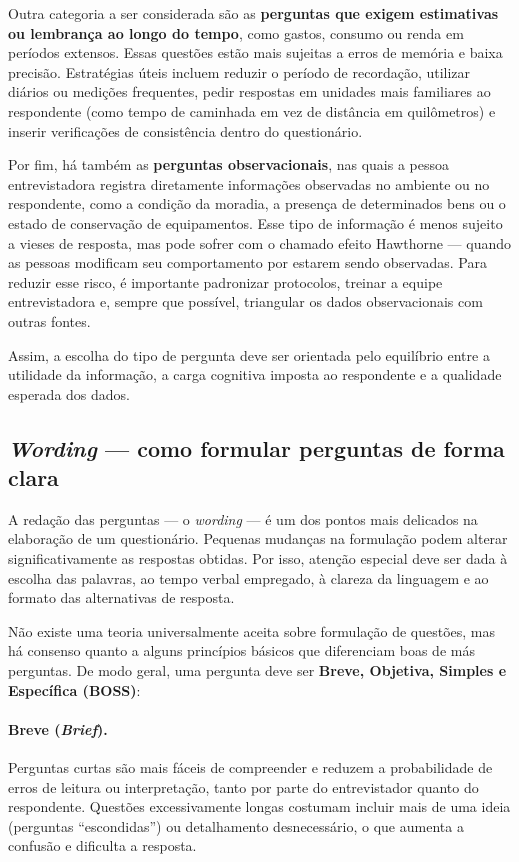 \documentclass[12pt, a4paper, openany]{book}
\begin{document}
Outra categoria a ser considerada s\~ao as \textbf{perguntas que exigem estimativas ou lembran\c{c}a ao longo do tempo}, como gastos, consumo ou renda em per\'iodos extensos. Essas quest\~oes est\~ao mais sujeitas a erros de mem\'oria e baixa precis\~ao. Estrat\'egias \'uteis incluem reduzir o per\'iodo de recorda\c{c}\~ao, utilizar di\'arios ou medi\c{c}\~oes frequentes, pedir respostas em unidades mais familiares ao respondente (como tempo de caminhada em vez de dist\^ancia em quil\^ometros) e inserir verifica\c{c}\~oes de consist\^encia dentro do question\'ario.

Por fim, h\'a tamb\'em as \textbf{perguntas observacionais}, nas quais a pessoa entrevistadora registra diretamente informa\c{c}\~oes observadas no ambiente ou no respondente, como a condi\c{c}\~ao da moradia, a presen\c{c}a de determinados bens ou o estado de conserva\c{c}\~ao de equipamentos. Esse tipo de informa\c{c}\~ao \'e menos sujeito a vieses de resposta, mas pode sofrer com o chamado efeito Hawthorne --- quando as pessoas modificam seu comportamento por estarem sendo observadas. Para reduzir esse risco, \'e importante padronizar protocolos, treinar a equipe entrevistadora e, sempre que poss\'ivel, triangular os dados observacionais com outras fontes.

Assim, a escolha do tipo de pergunta deve ser orientada pelo equil\'ibrio entre a utilidade da informa\c{c}\~ao, a carga cognitiva imposta ao respondente e a qualidade esperada dos dados.

\subsection{\textit{Wording} --- como formular perguntas de forma clara}

A reda\c{c}\~ao das perguntas --- o \textit{wording} --- \'e um dos pontos mais delicados na elabora\c{c}\~ao de um question\'ario. Pequenas mudan\c{c}as na formula\c{c}\~ao podem alterar significativamente as respostas obtidas. Por isso, aten\c{c}\~ao especial deve ser dada \`a escolha das palavras, ao tempo verbal empregado, \`a clareza da linguagem e ao formato das alternativas de resposta.

N\~ao existe uma teoria universalmente aceita sobre formula\c{c}\~ao de quest\~oes, mas h\'a consenso quanto a alguns princ\'ipios b\'asicos que diferenciam boas de m\'as perguntas. De modo geral, uma pergunta deve ser \textbf{Breve, Objetiva, Simples e Espec\'ifica (BOSS)}:

\paragraph{Breve (\textit{Brief}).} Perguntas curtas s\~ao mais f\'aceis de compreender e reduzem a probabilidade de erros de leitura ou interpreta\c{c}\~ao, tanto por parte do entrevistador quanto do respondente. Quest\~oes excessivamente longas costumam incluir mais de uma ideia (perguntas ``escondidas'') ou detalhamento desnecess\'ario, o que aumenta a confus\~ao e dificulta a resposta.
\end{document}
